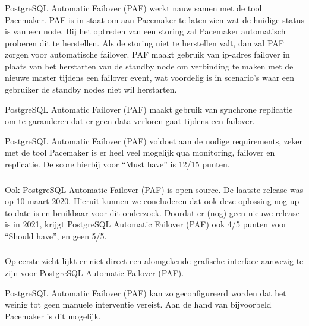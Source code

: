 \subsubsection{}
\label{subsubsec:Must have}

PostgreSQL Automatic Failover (PAF) werkt nauw samen met de tool Pacemaker. PAF is in staat om aan Pacemaker te laten zien wat de huidige status is van een node. Bij het optreden van een storing zal Pacemaker automatisch proberen dit te herstellen.
Als de storing niet te herstellen valt, dan zal PAF zorgen voor automatische failover. PAF maakt gebruik van ip-adres failover in plaats van het herstarten van de standby node om verbinding te maken met de nieuwe master tijdens een failover event, wat voordelig is in scenario's waar een gebruiker de standby nodes niet wil herstarten.

PostgreSQL Automatic Failover (PAF) maakt gebruik van synchrone replicatie om te garanderen dat er geen data verloren gaat tijdens een failover.

PostgreSQL Automatic Failover (PAF) voldoet aan de nodige requirements, zeker met de tool Pacemaker is er heel veel mogelijk qua monitoring, failover en replicatie. De score hierbij voor “Must have” is 12/15 punten.

\subsubsection{}
\label{subsubsec:Should have}

Ook PostgreSQL Automatic Failover (PAF) is open source.
De laatste release was op 10 maart 2020. Hieruit kunnen we concluderen dat ook deze oplossing nog up-to-date is en bruikbaar voor dit onderzoek. 
Doordat er (nog) geen nieuwe release is in 2021, krijgt PostgreSQL Automatic Failover (PAF) ook 4/5 punten voor “Should have”, en geen 5/5.

\subsubsection{}
\label{subsubsec:Could have}

Op eerste zicht lijkt er niet direct een alomgekende grafische interface aanwezig te zijn voor PostgreSQL Automatic Failover (PAF).

PostgreSQL Automatic Failover (PAF) kan zo geconfigureerd worden dat het weinig tot geen manuele interventie vereist. Aan de hand van bijvoorbeld Pacemaker is dit mogelijk.



